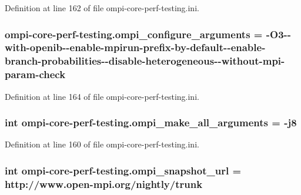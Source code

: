 Definition at line 162 of file ompi-\/core-\/perf-\/testing.\-ini.

\hypertarget{namespaceompi-core-perf-testing_a5417df6f672d37ff96b65443a6b2a147}{
\subsubsection[{ompi\-\_\-configure\-\_\-arguments}]{\setlength{\rightskip}{0pt plus 5cm}ompi-\/core-\/perf-\/testing.\-ompi\-\_\-configure\-\_\-arguments = -\/O3-\/-\/with-\/openib-\/-\/enable-\/mpirun-\/prefix-\/by-\/default-\/-\/enable-\/branch-\/probabilities-\/-\/disable-\/heterogeneous-\/-\/without-\/mpi-\/param-\/check}}\label{namespaceompi-core-perf-testing_a5417df6f672d37ff96b65443a6b2a147}


Definition at line 164 of file ompi-\/core-\/perf-\/testing.\-ini.

\hypertarget{namespaceompi-core-perf-testing_a226230ce64cc634de35c2f12abdd54f2}{
\subsubsection[{ompi\-\_\-make\-\_\-all\-\_\-arguments}]{\setlength{\rightskip}{0pt plus 5cm}int ompi-\/core-\/perf-\/testing.\-ompi\-\_\-make\-\_\-all\-\_\-arguments = -\/j8}}\label{namespaceompi-core-perf-testing_a226230ce64cc634de35c2f12abdd54f2}


Definition at line 160 of file ompi-\/core-\/perf-\/testing.\-ini.

\hypertarget{namespaceompi-core-perf-testing_aff15245731ec5f27b42a7377c4ea9555}{
\subsubsection[{ompi\-\_\-snapshot\-\_\-url}]{\setlength{\rightskip}{0pt plus 5cm}int ompi-\/core-\/perf-\/testing.\-ompi\-\_\-snapshot\-\_\-url = http\-://www.\-open-\/mpi.\-org/nightly/trunk}}\label{namespaceompi-core-perf-testing_aff15245731ec5f27b42a7377c4ea9555}


